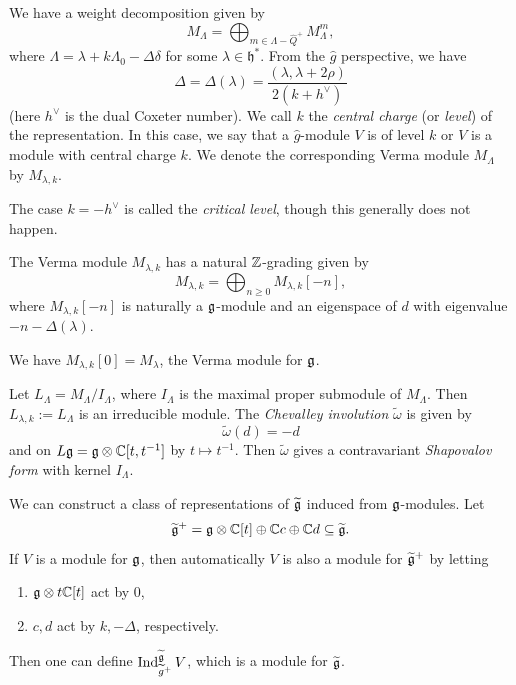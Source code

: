 \begin{remark}
  We have a weight decomposition given by
  \[
    M_\Lambda = \bigoplus_{m \in \Lambda - \widehat{Q}^+} M_\Lambda^m,
  \]
  where $\Lambda = \lambda + k \Lambda_0 - \Delta \delta$
  for some $\lambda \in \mathfrak{h}^*$.
  From the $\widehat{g}$ perspective, we
  have
  \[
    \Delta = \Delta(\lambda)
    = \frac{(\lambda, \lambda + 2 \rho)}{2(k + h^\vee)}
  \]
  (here $h^\vee$ is the dual Coxeter number).
  We call $k$ the \emph{central charge}
  (or \emph{level}) of the representation.
  In this case, we say that a
  $\widehat{g}$-module $V$ is
  of level $k$ or $V$ is a module with
  central charge $k$. We denote the
  corresponding Verma module $M_{\Lambda}$
  by $M_{\lambda, k}$.

  The case
  $k = - h^\vee$ is called the
  \emph{critical level}, though this
  generally does not happen.
\end{remark}

\begin{remark}
  The Verma module $M_{\lambda, k}$ has
  a natural $\mathbb{Z}$-grading given by
  \[
    M_{\lambda, k}
    = \bigoplus_{n \ge 0} M_{\lambda, k}[-n],
  \]
  where $M_{\lambda, k}[-n]$ is naturally a
  $\mathfrak{g}$-module and an eigenspace of
  $d$ with eigenvalue $-n - \Delta(\lambda)$.
\end{remark}

\begin{example}
  We have $M_{\lambda, k}[0] = M_\lambda$,
  the Verma module for $\mathfrak{g}$.
\end{example}

\begin{remark}
  Let $L_\Lambda = M_\Lambda / I_\Lambda$,
  where $I_\Lambda$ is the maximal
  proper submodule of $M_\Lambda$. Then
  $L_{\lambda, k} := L_\Lambda$ is an irreducible module.
  The \emph{Chevalley involution}
  $\widetilde{\omega}$
  is given by
  \[
    \widetilde{\omega}(d) = -d
  \]
  and on $L\mathfrak{g} = \mathfrak{g} \otimes \mathbb{C}[t, t^{-1}]$
  by $t \mapsto t^{-1}$. Then
  $\widetilde{\omega}$ gives a
  contravariant \emph{Shapovalov form}
  with kernel $I_\Lambda$.
\end{remark}

\begin{remark}
  We can construct a class of
  representations of $\widetilde{\mathfrak{g}}$ induced
  from $\mathfrak{g}$-modules. Let
  \[
    \widetilde{\mathfrak{g}}^+
    = \mathfrak{g} \otimes \mathbb{C}[t] \oplus \mathbb{C} c \oplus \mathbb{C} d \subseteq \widetilde{\mathfrak{g}}.
  \]
  If $V$ is a module for $\mathfrak{g}$,
  then automatically $V$ is also a module
  for $\widetilde{\mathfrak{g}}^+$ by letting
  \begin{enumerate}
    \item $\mathfrak{g} \otimes t\mathbb{C}[t]$ act by $0$,
    \item $c, d$ act by
      $k, -\Delta$, respectively.
  \end{enumerate}
  Then one can define
  $\operatorname{Ind}_{\widetilde{g}^+}^{\widetilde{\mathfrak{g}}} V$,
  which is a module for $\widetilde{\mathfrak{g}}$.
\end{remark}

